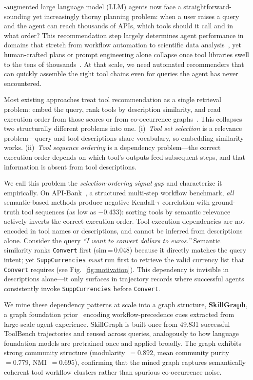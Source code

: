 \documentclass[lettersize,journal]{IEEEtran}
\begin{document}
-augmented large language model (LLM) agents now face a straightforward-sounding yet increasingly thorny planning problem: when a user raises a query and the agent can reach thousands of APIs, which tools should it call and in what order?
This recommendation step largely determines agent performance in domains that stretch from workflow automation to scientific data analysis~\cite{react,toolllm,toolformer}, yet human-crafted plans or prompt engineering alone collapse once tool libraries swell to the tens of thousands~\cite{toolllm}.
At that scale, we need automated recommenders that can quickly assemble the right tool chains even for queries the agent has never encountered.

Most existing approaches treat tool recommendation as a single retrieval problem: embed the query, rank tools by description similarity, and read execution order from those scores or from co-occurrence graphs~\cite{toolllm}.
This collapses two structurally different problems into one.
(i)~\emph{Tool set selection} is a relevance problem---query and tool descriptions share vocabulary, so embedding similarity works.
(ii)~\emph{Tool sequence ordering} is a dependency problem---the correct execution order depends on which tool's outputs feed subsequent steps, and that information is absent from tool descriptions.



We call this problem the \emph{selection-ordering signal gap} and characterize it empirically.
On API-Bank~\cite{apibank}, a structured multi-step workflow benchmark, \emph{all} semantic-based methods produce negative Kendall-$\tau$ correlation with ground-truth tool sequences (as low as $-0.433$): sorting tools by semantic relevance actively inverts the correct execution order.
Tool execution dependencies are not encoded in tool names or descriptions, and cannot be inferred from descriptions alone.
Consider the query \emph{``I want to convert dollars to euros.''} Semantic similarity ranks \texttt{Convert} first (sim\,=\,0.048) because it directly matches the query intent; yet \texttt{SuppCurrencies} \emph{must} run first to retrieve the valid currency list that \texttt{Convert} requires (see Fig.~\ref{fig:motivation}).
This dependency is invisible in descriptions alone---it only surfaces in trajectory records where successful agents consistently invoke \texttt{SuppCurrencies} before \texttt{Convert}.

We mine these dependency patterns at scale into a graph structure, \textbf{SkillGraph}, a graph foundation prior~\cite{gfm_survey} encoding workflow-precedence cues extracted from large-scale agent experience.
SkillGraph is built once from 49,831 successful ToolBench trajectories and reused across queries, analogously to how language foundation models are pretrained once and applied broadly.
The graph exhibits strong community structure (modularity~$= 0.892$, mean community purity~$= 0.779$, NMI~$= 0.695$), confirming that the mined graph captures semantically coherent tool workflow clusters rather than spurious co-occurrence noise.
\end{document}
